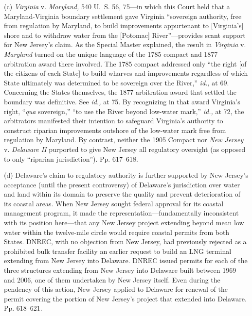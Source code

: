   (c) \emph{Virginia} v. \emph{Maryland,} 540 U.~S. 56, 75---in which
this Court held that a Maryland-Virginia boundary settlement gave
Virginia ``sovereign authority, free from regulation by Maryland, to
build improvements appurtenant to [Virginia's] shore and to withdraw
water from the [Potomac] River''---provides scant support for New
Jersey's claim. As the Special Master explained, the result in
\emph{Virginia} v. \emph{Maryland} turned on the unique language of the 1785
compact and 1877 arbitration award there involved. The 1785 compact
addressed only ``the right [of the \newpage  citizens of each State] to
build wharves and improvements regardless of which State ultimately
was determined to be sovereign over the River,'' \emph{id.,} at 69.
Concerning the States themselves, the 1877 arbitration award that
settled the boundary was definitive. See \emph{id.,} at 75. By recognizing
in that award Virginia's right, ``\emph{qua} sovereign,'' ``to use
the River beyond low-water mark,'' \emph{id.,} at 72, the arbitrators
manifested their intention to safeguard Virginia's authority to
construct riparian improvements outshore of the low-water mark free from
regulation by Maryland. By contrast, neither the 1905 Compact nor \emph{New
Jersey} v. \emph{Delaware II} purported to give New Jersey all regulatory
oversight (as opposed to only ``riparian jurisdiction''). Pp.
617--618.

  (d) Delaware's claim to regulatory authority is further supported
by New Jersey's acceptance (until the present controversy) of
Delaware's jurisdiction over water and land within its domain to
preserve the quality and prevent deterioration of its coastal areas.
When New Jersey sought federal approval for its coastal management
program, it made the representation---fundamentally inconsistent with
its position here---that any New Jersey project extending beyond
mean low water within the twelve-mile circle would require coastal
permits from both States. DNREC, with no objection from New Jersey,
had previously rejected as a prohibited bulk transfer facility an
earlier request to build an LNG terminal extending from New Jersey
into Delaware. DNREC issued permits for each of the three structures
extending from New Jersey into Delaware built between 1969 and 2006, one
of them undertaken by New Jersey itself. Even during the pendency of
this action, New Jersey applied to Delaware for renewal of the permit
covering the portion of New Jersey's project that extended into
Delaware. Pp. 618--621.

